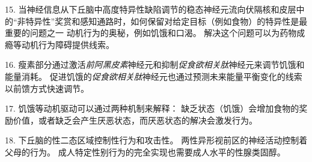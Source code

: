 15. 当神经信息从下丘脑中高度特异性缺陷调节的稳态神经元流向伏隔核和皮层中的“非特异性”奖赏和感知通路时，如何保留对给定目标（例如食物）的特异性是最重要的问题之一 动机行为的奥秘，例如饥饿和口渴。
解决这个问题可以为药物成瘾等动机行为障碍提供线索。 


16. 瘦素部分通过激活\textit{前阿黑皮素}神经元和抑制\textit{促食欲相关肽}神经元来调节饥饿和能量消耗。
促进饥饿的\textit{促食欲相关肽}神经元也通过预测未来能量平衡变化的线索以前馈方式快速调节。


17. 饥饿等动机驱动可以通过两种机制来解释：
缺乏状态（饥饿）会增加食物的奖励价值，或者缺乏会产生厌恶状态，而厌恶状态的解决会激发行为。 


18. 下丘脑的性二态区域控制性行为和攻击性。
两性异形视前区的神经活动控制着父母的行为。
成人特定性别行为的完全实现也需要成人水平的性腺类固醇。

